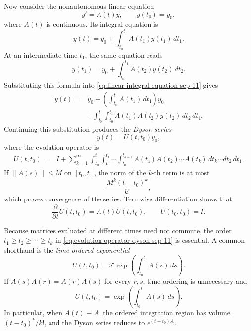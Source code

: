 Now consider the nonautonomous linear equation
\begin{equation}\label{eq:nonautonomous-linear-sep-11}
  y'=A(t)y,
  \qquad
  y(t_0)=y_0,
\end{equation}
where \(A(t)\) is continuous. Its integral equation is
\begin{equation}\label{eq:linear-integral-equation-sep-11}
  y(t)=y_0+\int_{t_0}^t A(t_1)y(t_1)\,dt_1.
\end{equation}
At an intermediate time \(t_1\), the same equation reads
\[
  y(t_1)=y_0+\int_{t_0}^{t_1}A(t_2)y(t_2)\,dt_2.
\]
Substituting this formula into
\eqref{eq:linear-integral-equation-sep-11} gives
\begin{align*}
  y(t)
  ={}&y_0+\left(\int_{t_0}^t A(t_1)\,dt_1\right)y_0\\
  &+\int_{t_0}^t\int_{t_0}^{t_1}
    A(t_1)A(t_2)y(t_2)\,dt_2\,dt_1.
\end{align*}
Continuing this substitution produces the \emph{Dyson series}
\begin{equation}\label{eq:dyson-series-sep-11}
  y(t)=U(t,t_0)y_0,
\end{equation}
where the evolution operator is
\begin{align}
  U(t,t_0)
  ={}&I+\sum_{k=1}^{\infty}
  \int_{t_0}^t\int_{t_0}^{t_1}\cdots
  \int_{t_0}^{t_{k-1}}
  A(t_1)A(t_2)\cdots A(t_k)
  \,dt_k\cdots dt_2\,dt_1.
  \label{eq:evolution-operator-dyson-sep-11}
\end{align}
If \(\lVert A(s)\rVert\leq M\) on \([t_0,t]\), the norm of the
\(k\)-th term is at most
\[
  \frac{M^k(t-t_0)^k}{k!},
\]
which proves convergence of the series. Termwise differentiation shows
that
\[
  \frac{\partial}{\partial t}U(t,t_0)=A(t)U(t,t_0),
  \qquad
  U(t_0,t_0)=I.
\]

Because matrices evaluated at different times need not commute, the
order \(t_1\geq t_2\geq\cdots\geq t_k\) in
\eqref{eq:evolution-operator-dyson-sep-11} is essential. A common
shorthand is the \emph{time-ordered exponential}
\begin{equation}\label{eq:time-ordered-exponential-sep-11}
  U(t,t_0)
  =\mathcal{T}\exp\left(\int_{t_0}^t A(s)\,ds\right).
\end{equation}
If \(A(s)A(r)=A(r)A(s)\) for every \(r,s\), time ordering is
unnecessary and
\[
  U(t,t_0)=\exp\left(\int_{t_0}^t A(s)\,ds\right).
\]
In particular, when \(A(t)\equiv A\), the ordered integration region
has volume \((t-t_0)^k/k!\), and the Dyson series reduces to
\(e^{(t-t_0)A}\).

